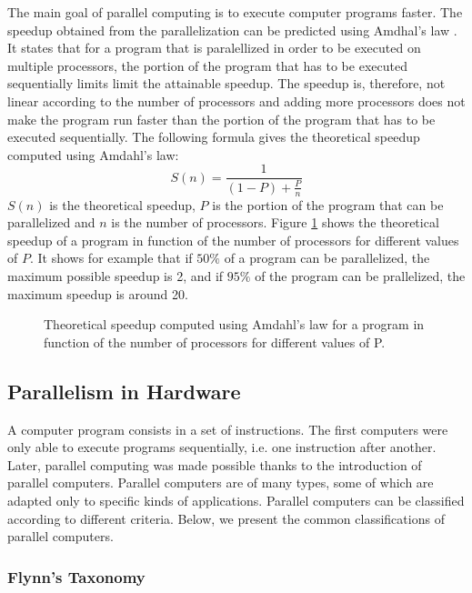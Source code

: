 The main goal of parallel computing is to execute computer programs faster. The speedup obtained from the parallelization can be predicted using Amdhal's law \cite{amdahl:1967}. It states that for a program that is paralellized in order to be executed on multiple processors, the portion of the program that has to be executed sequentially limits limit the attainable speedup. The speedup is, therefore, not linear according to the number of processors and adding more processors does not make the program run faster than the portion of the program that has to be executed sequentially. The following formula gives the theoretical speedup computed using Amdahl's law:
\begin{equation}
S(n) = \frac{1}{(1-P) + \frac{P}{n}}
\end{equation}
$S(n)$ is the theoretical speedup, $P$ is the portion of the program that can be parallelized and $n$ is the number of processors. Figure \ref{fig:amdhal} shows the theoretical speedup of a program in function of the number of processors for different values of $P$. It shows for example that if $50\%$ of a program can be parallelized, the maximum possible speedup is 2, and if $95\%$ of the program can be prallelized, the maximum speedup is around 20.

\begin{figure}[phbt]
\centering
\captionsetup{justification=centering}

\caption{Theoretical speedup computed using Amdahl’s law for a program in function of the number of processors for different values of P.}
\label{fig:amdhal}
\end{figure} 

\subsection{Parallelism in Hardware}

A computer program consists in a set of instructions. The first computers were only able to execute programs sequentially, i.e. one instruction after another. Later, parallel computing was made possible thanks to the introduction of parallel computers. Parallel computers are of many types, some of which are adapted only to specific kinds of applications. Parallel computers can be classified according to different criteria. Below, we present the common classifications of parallel computers. 

\subsubsection{Flynn's Taxonomy}

